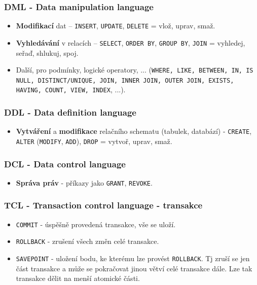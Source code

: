 \subsubsection{DML - Data manipulation language}
\begin{itemize}
	\item \textbf{Modifikací} dat --  \texttt{INSERT}, \texttt{UPDATE}, \texttt{DELETE} = vlož, uprav, smaž.
	\item \textbf{Vyhledávání} v relacích --  \texttt{SELECT}, \texttt{ORDER BY},  \texttt{GROUP BY}, \texttt{JOIN} = vyhledej, seřaď, shlukuj, spoj.	
	\item Další, pro podmínky, logické operatory, ... (\texttt{WHERE, LIKE, BETWEEN, IN, IS NULL, DISTINCT/UNIQUE, JOIN, INNER JOIN, OUTER JOIN, EXISTS, HAVING, COUNT, VIEW, INDEX}, ...).
\end{itemize}

\subsubsection{DDL - Data definition language}
\begin{itemize}
	\item \textbf{Vytváření} a \textbf{modifikace} relačního schematu (tabulek, databází) - \texttt{CREATE}, \texttt{ALTER} (\texttt{MODIFY}, \texttt{ADD}), \texttt{DROP}  = vytvoř, uprav, smaž.
\end{itemize}

\subsubsection{DCL - Data control language}
\begin{itemize}
	\item \textbf{Správa práv} - příkazy jako \texttt{GRANT}, \texttt{REVOKE}.
\end{itemize}

\subsubsection{TCL - Transaction control language - transakce}
\begin{itemize}
	\item \texttt{COMMIT} - úspěšně provedená transakce, vše se uloží.
	\item \texttt{ROLLBACK} - zrušení všech změn celé transakce.
	\item \texttt{SAVEPOINT} - uložení bodu, ke kterému lze provést \texttt{ROLLBACK}. Tj zruší se jen část transakce a může se pokračovat jinou větví celé transakce dále. Lze tak transakce dělit na menší atomické části.
\end{itemize}

